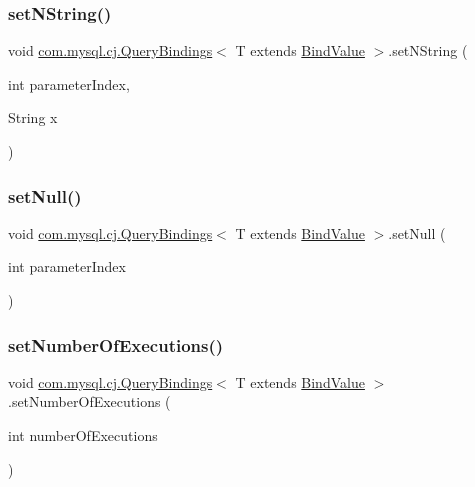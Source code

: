 \subsubsection{\texorpdfstring{set\+N\+String()}{setNString()}}
{\footnotesize\ttfamily void \mbox{\hyperlink{interfacecom_1_1mysql_1_1cj_1_1_query_bindings}{com.\+mysql.\+cj.\+Query\+Bindings}}$<$ T extends \mbox{\hyperlink{interfacecom_1_1mysql_1_1cj_1_1_bind_value}{Bind\+Value}} $>$.set\+N\+String (\begin{DoxyParamCaption}\item[{int}]{parameter\+Index,  }\item[{String}]{x }\end{DoxyParamCaption})}

\mbox{\label{interfacecom_1_1mysql_1_1cj_1_1_query_bindings_af1a5be4b4810642f2b13d0123e427161}} 
\subsubsection{\texorpdfstring{set\+Null()}{setNull()}}
{\footnotesize\ttfamily void \mbox{\hyperlink{interfacecom_1_1mysql_1_1cj_1_1_query_bindings}{com.\+mysql.\+cj.\+Query\+Bindings}}$<$ T extends \mbox{\hyperlink{interfacecom_1_1mysql_1_1cj_1_1_bind_value}{Bind\+Value}} $>$.set\+Null (\begin{DoxyParamCaption}\item[{int}]{parameter\+Index }\end{DoxyParamCaption})}

\mbox{\label{interfacecom_1_1mysql_1_1cj_1_1_query_bindings_a2a30b6f50c4c33fcfef0500197a28bb8}} 
\subsubsection{\texorpdfstring{set\+Number\+Of\+Executions()}{setNumberOfExecutions()}}
{\footnotesize\ttfamily void \mbox{\hyperlink{interfacecom_1_1mysql_1_1cj_1_1_query_bindings}{com.\+mysql.\+cj.\+Query\+Bindings}}$<$ T extends \mbox{\hyperlink{interfacecom_1_1mysql_1_1cj_1_1_bind_value}{Bind\+Value}} $>$.set\+Number\+Of\+Executions (\begin{DoxyParamCaption}\item[{int}]{number\+Of\+Executions }\end{DoxyParamCaption})}

